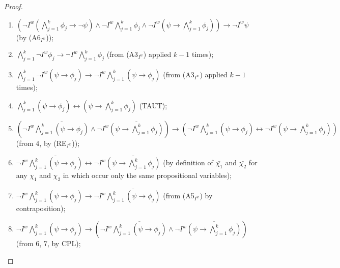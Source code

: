\documentclass[10pt,a4paper]{amsart}
\begin{document}
\begin{proof}

\

\begin{enumerate}

\item $(\neg I^{w} (\bigwedge^{k}_{j=1} \phi_{j} \rightarrow \neg \psi) \wedge \neg I^{w}\bigwedge^{k}_{j=1} \phi_{j}  \wedge \neg I^{w}(\psi \rightarrow \bigwedge^{k}_{j=1} \phi_{j} )) \rightarrow \neg I^{w} \psi$ (by (A6$_{I^{w}}$));

\item $\bigwedge^{k}_{j=1} \neg I^{w} \phi_{j} \rightarrow \neg I^{w} \bigwedge^{k}_{j=1} \phi_{j}$ (from (A3$_{I^{w}}$) applied $k - 1$ times);

\item $\bigwedge^{k}_{j=1} \neg I^{w}(\psi \rightarrow \phi_{j}) \rightarrow \neg I^{w} \bigwedge^{k}_{j=1} (\psi \rightarrow \phi_{j})$ (from (A3$_{I^{w}}$) applied $k-1$ times);

\item $\bigwedge^{k}_{j=1} (\psi \rightarrow \phi_{j}) \leftrightarrow (\psi \rightarrow \bigwedge^{k}_{j=1} \phi_{j})$ (TAUT);

\item $(\neg I^{w} \overline{\bigwedge^{k}_{j=1} (\psi \rightarrow \phi_{j})} \wedge \neg I^{w} \overline{(\psi \rightarrow \bigwedge^{k}_{j=1} \phi_{j})}) \rightarrow (\neg I^{w} \bigwedge^{k}_{j=1} (\psi \rightarrow \phi_{j}) \leftrightarrow \neg I^{w} (\psi \rightarrow \bigwedge^{k}_{j=1} \phi_{j}))$ (from 4, by (RE$_{I^{w}}$));

\item $\neg I^{w} \overline{\bigwedge^{k}_{j=1} (\psi \rightarrow \phi_{j})} \leftrightarrow \neg I^{w} \overline{(\psi \rightarrow \bigwedge^{k}_{j=1} \phi_{j})}$ (by definition of $\bar{\chi_{1}}$ and $\bar{\chi_{2}}$ for any $\chi_{1}$ and $\chi_{2}$ in which occur only the same propositional variables);

\item $\neg I^{w} \bigwedge^{k}_{j=1} (\psi \rightarrow \phi_{j}) \rightarrow \neg I^{w} \overline{\bigwedge^{k}_{j=1} (\psi \rightarrow \phi_{j})}$ (from (A5$_{I^{w}}$) by contraposition);

\item $\neg I^{w} \bigwedge^{k}_{j=1} (\psi \rightarrow \phi_{j}) \rightarrow (\neg I^{w} \overline{\bigwedge^{k}_{j=1} (\psi \rightarrow \phi_{j})} \wedge \neg I^{w} \overline{(\psi \rightarrow \bigwedge^{k}_{j=1} \phi_{j})})$ (from 6, 7, by CPL);
 


\end{enumerate}
\end{proof}
\end{document}
